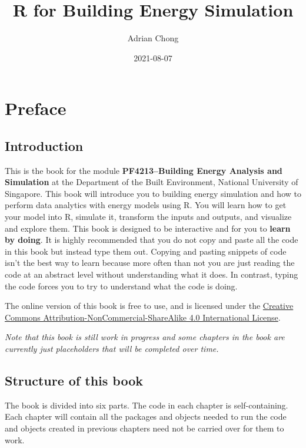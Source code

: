 \documentclass[
]{book}
\title{R for Building Energy Simulation}
\author{Adrian Chong}
\date{2021-08-07}
\begin{document}
\maketitle

{
\setcounter{tocdepth}{1}
\tableofcontents
}
\hypertarget{preface}{%
\chapter*{Preface}\label{preface}}

\hypertarget{introduction}{%
\section*{Introduction}\label{introduction}}

This is the book for the module \textbf{PF4213--Building Energy Analysis and Simulation} at the Department of the Built Environment, National University of Singapore. This book will introduce you to building energy simulation and how to perform data analytics with energy models using R. You will learn how to get your model into R, simulate it, transform the inputs and outputs, and visualize and explore them. This book is designed to be interactive and for you to \textbf{learn by doing}. It is highly recommended that you do not copy and paste all the code in this book but instead type them out. Copying and pasting snippets of code isn't the best way to learn because more often than not you are just reading the code at an abstract level without understanding what it does. In contrast, typing the code forces you to try to understand what the code is doing.

The online version of this book is free to use, and is licensed under the \href{https://creativecommons.org/licenses/by-nc-sa/4.0/}{Creative Commons Attribution-NonCommercial-ShareAlike 4.0 International License}.

\emph{Note that this book is still work in progress and some chapters in the book are currently just placeholders that will be completed over time.}

\hypertarget{structure-of-this-book}{%
\section*{Structure of this book}\label{structure-of-this-book}}

The book is divided into six parts. The code in each chapter is self-containing. Each chapter will contain all the packages and objects needed to run the code and objects created in previous chapters need not be carried over for them to work.
\end{document}
